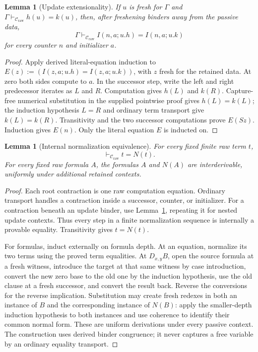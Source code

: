 \documentclass[11pt,a4paper]{article}
\newtheorem{lemma}[theorem]{Lemma}
\theoremstyle{definition}\newtheorem{definition}[theorem]{Definition}
\theoremstyle{remark}\newtheorem{remark}[theorem]{Remark}
\begin{document}
\begin{lemma}[Update extensionality]
\label{lem:nb-update}
If $u$ is fresh for $\Gamma$ and
$\Gamma\vdash_{\mathcal C_{\mathrm{raw}}}h(u)=k(u)$, then, after
freshening binders away from the passive data,
\[
 \Gamma\vdash_{\mathcal C_{\mathrm{raw}}}
     I(n,a;u.h)=I(n,a;u.k)
\]
for every counter $n$ and initializer $a$.
\end{lemma}
\begin{proof}
Apply derived literal-equation induction to
$E(z):=(I(z,a;u.h)=I(z,a;u.k))$, with $z$ fresh for the retained data.
At zero both sides compute to $a$. In the successor step, write the
left and right predecessor iterates as $L$ and $R$. Computation gives
$h(L)$ and $k(R)$. Capture-free numerical substitution in the supplied
pointwise proof gives $h(L)=k(L)$; the induction hypothesis $L=R$
and ordinary term transport give $k(L)=k(R)$. Transitivity and the
two successor computations prove $E(Sz)$. Induction gives $E(n)$.
Only the literal equation $E$ is inducted on.
\end{proof}

\begin{lemma}[Internal normalization equivalence]
\label{lem:nb-internal}
For every fixed finite raw term $t$,
\[
              \vdash_{\mathcal C_{\mathrm{raw}}}t=N(t).
\]
For every fixed raw formula $A$, the formulas $A$ and $N(A)$ are
interderivable, uniformly under additional retained contexts.
\end{lemma}
\begin{proof}
Each root contraction is one raw computation equation. Ordinary
transport handles a contraction inside a successor, counter, or
initializer. For a contraction beneath an update binder, use
Lemma~\ref{lem:nb-update}, repeating it for nested update contexts.
Thus every step in a finite normalization sequence is internally a
provable equality. Transitivity gives $t=N(t)$.

For formulas, induct externally on formula depth. At an equation,
normalize its two terms using the proved term equalities. At
$D_{x,y}B$, open the source formula at a fresh witness, introduce the
target at that same witness by case introduction, convert the new
zero base to the old one by the induction hypothesis, use the old
clause at a fresh successor, and convert the result back. Reverse the
conversions for the reverse implication. Substitution may create fresh
redexes in both an instance of $B$ and the corresponding instance of
$N(B)$: apply the smaller-depth induction hypothesis to both instances
and use coherence to identify their common normal form. These are uniform
derivations under every passive context. The construction uses
derived binder congruence; it never captures a free variable by an
ordinary equality transport.
\end{proof}
\end{document}
